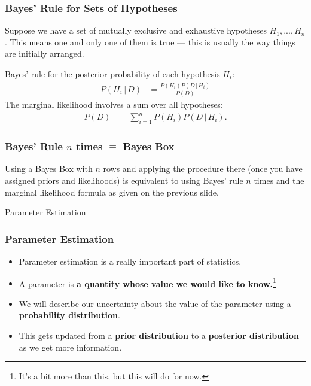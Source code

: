 \documentclass{beamer}
\newcommand{\given}{\,|\,}
\begin{document}
\begin{frame}
\frametitle{Bayes' Rule for Sets of Hypotheses}
Suppose we have a set of mutually exclusive and exhaustive hypotheses
$H_1, ..., H_n$. This means one and only one of them is true --- this is usually
the way things are initially arranged.\pause

Bayes' rule for the posterior probability of each hypothesis $H_i$:
\begin{align}
P(H_i \given D) &= \frac{P(H_i)P(D \given H_i)}{P(D)}
\end{align}\pause
The marginal likelihood involves a sum over all hypotheses:
\begin{align}
P(D) &= \sum_{i=1}^n P(H_i)P(D \given H_i).
\end{align}

\end{frame}


\begin{frame}
\frametitle{Bayes' Rule $n$ times $\equiv$ Bayes Box}
Using a Bayes Box with $n$ rows and applying the procedure there
(once you have assigned priors and likelihoods) is equivalent
to using Bayes' rule $n$ times and the marginal likelihood formula
as given on the previous slide.

\end{frame}

\begin{frame}

\begin{center}
\Large
Parameter Estimation
\end{center}

\end{frame}


\begin{frame}
\frametitle{Parameter Estimation}

\begin{itemize}
\item Parameter estimation is a really important part of statistics.\pause
\item A parameter is {\bf a quantity whose value we would like to
        know.}\footnote{It's a bit more than this, but this will do for now.}\pause
\item We will describe our uncertainty about the value of the parameter
using a {\bf probability distribution}.\pause
\item This gets updated from a {\bf prior distribution}
    to a {\bf posterior distribution}
    as we get more information.
\end{itemize}

\end{frame}
\end{document}
